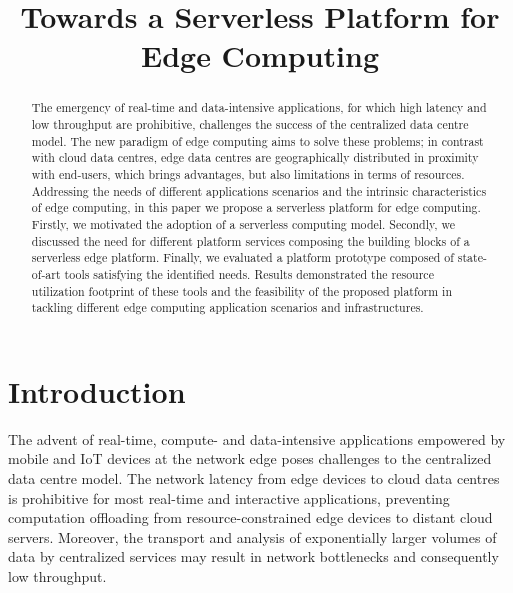 \documentclass[letterpaper, 10 pt, conference]{ieeeconf}  %
\title{\LARGE \bf
Towards a Serverless Platform for Edge Computing
}
\author{\IEEEauthorblockN{Luciano Baresi and
Danilo Filgueira Mendonça}
\IEEEauthorblockA{Politecnico di Milano\\
Milano, Italy}}
\begin{document}
\maketitle
\thispagestyle{empty}
\pagestyle{empty}


\begin{abstract}

The emergency of real-time and data-intensive applications, for which high latency and low throughput are prohibitive, challenges the success of the centralized data centre model. The new paradigm of edge computing aims to solve these problems; in contrast with cloud data centres, edge data centres are geographically distributed in proximity with end-users, which brings advantages, but also limitations in terms of resources. 
Addressing the needs of different applications scenarios and the intrinsic characteristics of edge computing, in this paper we propose a serverless platform for edge computing. Firstly, we motivated the adoption of a serverless computing model. Secondly, we discussed the need for different platform services composing the building blocks of a serverless edge platform. Finally, we evaluated a platform prototype composed of state-of-art tools satisfying the identified needs. Results demonstrated the resource utilization footprint of these tools and the feasibility of the proposed platform in tackling different edge computing application scenarios and infrastructures.



\end{abstract}


\section{Introduction}

The advent of real-time, compute- and data-intensive applications empowered by mobile and IoT devices at the network edge poses challenges to the centralized data centre model. The network latency from edge devices to cloud data centres is prohibitive for most real-time and interactive applications, preventing computation offloading from resource-constrained edge devices to distant cloud servers. Moreover, the transport and analysis of exponentially larger volumes of data by centralized services may result in network bottlenecks and consequently low throughput. 
\end{document}
